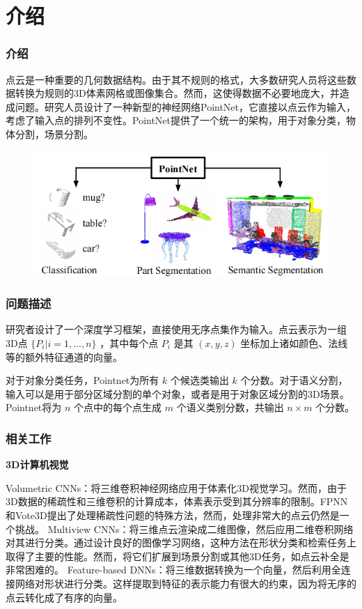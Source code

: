 \section{介绍}

\begin{frame}
  \frametitle{介绍}

点云是一种重要的几何数据结构。由于其不规则的格式，大多数研究人员将这些数据转换为规则的3D体素网格或图像集合。然而，这使得数据不必要地庞大，并造成问题。研究人员设计了一种新型的神经网络PointNet，它直接以点云作为输入，考虑了输入点的排列不变性。PointNet提供了一个统一的架构，用于对象分类，物体分割，场景分割。

\begin{figure}
\includegraphics[scale=0.55]{doc/img/f1.png}
\end{figure}

\end{frame}

\begin{frame}
 \frametitle{问题描述}

 研究者设计了一个深度学习框架，直接使用无序点集作为输入。点云表示为一组3D点 $\{P_i | i = 1, ... ,n \} $ ，其中每个点 $P_i$ 是其 $(x,y,z)$ 坐标加上诸如颜色、法线等的额外特征通道的向量。

对于对象分类任务，Pointnet为所有 $k$ 个候选类输出 $k$ 个分数。对于语义分割，输入可以是用于部分区域分割的单个对象，或者是用于对象区域分割的3D场景。Pointnet将为 $n$ 个点中的每个点生成 $m$ 个语义类别分数，共输出 $n \times m$ 个分数。

\end{frame}

\begin{frame}
\frametitle{相关工作}

\textbf{3D计算机视觉}

Volumetric CNNs：将三维卷积神经网络应用于体素化3D视觉学习。然而，由于3D数据的稀疏性和三维卷积的计算成本，体素表示受到其分辨率的限制。FPNN和Vote3D提出了处理稀疏性问题的特殊方法，然而，处理非常大的点云仍然是一个挑战。
Multiview CNNs：将三维点云渲染成二维图像，然后应用二维卷积网络对其进行分类。通过设计良好的图像学习网络，这种方法在形状分类和检索任务上取得了主要的性能。然而，将它们扩展到场景分割或其他3D任务，如点云补全是非常困难的。
Feature-based DNNs：将三维数据转换为一个向量，然后利用全连接网络对形状进行分类。这样提取到特征的表示能力有很大的约束，因为将无序的点云转化成了有序的向量。
    
\end{frame}

